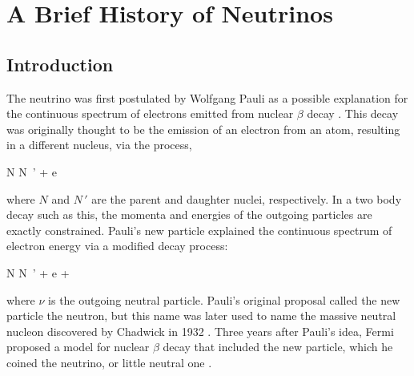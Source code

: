 
\chapter{A Brief History of Neutrinos}


\section{Introduction}

The neutrino was first postulated by Wolfgang Pauli as a possible explanation for the continuous spectrum of electrons emitted from nuclear $\beta$ decay \cite{ref:Pauli}. This decay was originally thought to be the emission of an electron from an atom, resulting in a different nucleus, via the process,

\beq
N \rightarrow N\ ' + e
\label{eq:BetaWrong}
\eeq

\n where $N$ and $N\,'$ are the parent and daughter nuclei, respectively. In a two body decay such as this, the momenta and energies of the outgoing particles are exactly constrained. Pauli's new particle explained the continuous spectrum of electron energy via a modified decay process:

\beq
N \rightarrow N\ ' + e + \nu
\label{eq:BetaRight}
\eeq

\n where $\nu$ is the outgoing neutral particle. Pauli's original proposal called the new particle the neutron, but this name was later used to name the massive neutral nucleon discovered by Chadwick in 1932 \cite{ref:Chadwick}. Three years after Pauli's idea, Fermi proposed a model for nuclear $\beta$ decay that included the new particle, which he coined the neutrino, or little neutral one \cite{ref:Fermi}.

